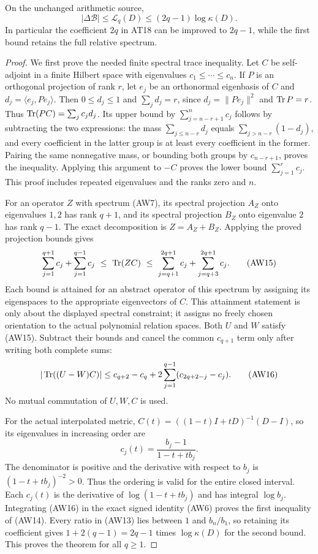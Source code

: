 \begin{theorem}
On the unchanged arithmetic source,
\[
 |\Delta\mathcal B|\le\mathcal L_q(D)
                  \le(2q-1)\log\kappa(D).
 \tag{AW14}
\]
In particular the coefficient $2q$ in AT18 can be improved to
$2q-1$, while the first bound retains the full relative spectrum.
\end{theorem}
\begin{proof}
We first prove the needed finite spectral trace inequality.
Let $C$ be self-adjoint in a finite Hilbert space with eigenvalues
$c_1\le\cdots\le c_n$. If $P$ is an orthogonal projection of
rank $r$, let $e_j$ be an orthonormal eigenbasis of $C$ and
$d_j=\langle e_j,Pe_j\rangle$. Then $0\le d_j\le1$ and
$\sum_jd_j=r$, since $d_j=\|Pe_j\|^2$ and $\operatorname{Tr} P=r$.
Thus $\operatorname{Tr}(PC)=\sum_jc_jd_j$.
Its upper bound by $\sum_{j=n-r+1}^n c_j$ follows by subtracting
the two expressions: the mass $\sum_{j\le n-r}d_j$ equals
$\sum_{j>n-r}(1-d_j)$, and every coefficient in the latter
group is at least every coefficient in the former. Pairing the
same nonnegative mass, or bounding both groups by $c_{n-r+1}$,
proves the inequality. Applying this argument to $-C$ proves
the lower bound $\sum_{j=1}^r c_j$. This proof includes repeated
eigenvalues and the ranks zero and $n$.

For an operator $Z$ with spectrum (AW7), its spectral projection
$A_Z$ onto eigenvalues $1,2$ has rank $q+1$, and its spectral
projection $B_Z$ onto eigenvalue $2$ has rank $q-1$.
The exact decomposition is $Z=A_Z+B_Z$. Applying the proved
projection bounds gives
\[
 \sum_{j=1}^{q+1}c_j+\sum_{j=1}^{q-1}c_j
 \ \le\ \operatorname{Tr}(ZC)\ \le\
 \sum_{j=q+1}^{2q+1}c_j+\sum_{j=q+3}^{2q+1}c_j.
 \tag{AW15}
\]
Each bound is attained for an abstract operator of this spectrum
by assigning its eigenspaces to the appropriate eigenvectors
of $C$. This attainment statement is only about the displayed
spectral constraint; it assigns no freely chosen orientation
to the actual polynomial relation spaces.
Both $U$ and $W$ satisfy (AW15). Subtract their bounds and cancel
the common $c_{q+1}$ term only after writing both complete sums:
\[
 |\operatorname{Tr}((U-W)C)|
 \le c_{q+2}-c_q
       +2\sum_{j=1}^{q-1}(c_{2q+2-j}-c_j).
 \tag{AW16}
\]
No mutual commutation of $U,W,C$ is used.

For the actual interpolated metric,
$C(t)=((1-t)I+tD)^{-1}(D-I)$, so its eigenvalues in increasing
order are
\[
 c_j(t)=\frac{b_j-1}{1-t+tb_j}.
 \tag{AW17}
\]
The denominator is positive and the derivative with respect
to $b_j$ is $(1-t+tb_j)^{-2}>0$. Thus the ordering is valid
for the entire closed interval. Each $c_j(t)$ is the derivative
of $\log(1-t+tb_j)$ and has integral $\log b_j$.
Integrating (AW16) in the exact signed identity (AW6) proves
the first inequality of (AW14). Every ratio in (AW13) lies
between $1$ and $b_n/b_1$, so retaining its coefficient gives
$1+2(q-1)=2q-1$ times $\log\kappa(D)$ for the second bound.
This proves the theorem for all $q\ge1$.
\end{proof}

